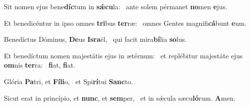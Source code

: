 \item Sit nomen ejus bene\textbf{díc}tum in \textbf{sǽ}\textbf{cu}la:~\psstar{} ante solem pérmanet \textbf{no}men \textbf{e}jus.
\item Et benedicéntur in ipso omnes \textbf{tri}bus \textbf{ter}ræ:~\psstar{} omnes Gentes magnifi\textbf{cá}bunt \textbf{e}um.
\item Benedíctus Dóminus, \textbf{De}us \textbf{Is}\textbf{ra}ël,~\psstar{} qui facit mira\textbf{bí}lia \textbf{so}lus.
\item Et benedíctum nomen majestátis ejus in ætérnum:~\pscross{} et replébitur majestáte ejus \textbf{om}nis \textbf{ter}ra:~\psstar{} \textbf{fi}at, \textbf{fi}at.
\item Glória \textbf{Pa}tri, et \textbf{Fí}\textbf{li}o,~\psstar{} et Spi\textbf{rí}tui \textbf{Sanc}to.
\item Sicut erat in princípio, et \textbf{nunc}, et \textbf{sem}per,~\psstar{} et in sǽcula sæcu\textbf{ló}rum. \textbf{A}men.

